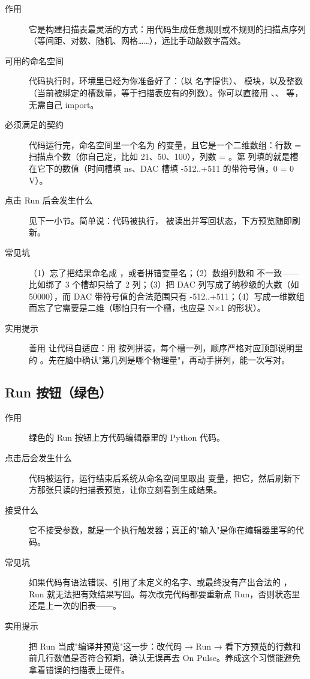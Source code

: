 \documentclass[11pt,oneside,openany]{book}
\begin{document}
\begin{description}
\item[作用] 它是构建扫描表最灵活的方式：用代码生成任意规则或不规则的扫描点序列（等间距、对数、随机、网格……），远比手动敲数字高效。
\item[可用的命名空间] 代码执行时，环境里已经为你准备好了：（以  名字提供）、 模块，以及整数 （当前被绑定的槽数量，等于扫描表应有的列数）。你可以直接用 、、 等，无需自己 import。
\item[必须满足的契约] 代码运行完，命名空间里一个名为  的变量，且它是一个二维数组：行数 = 扫描点个数（你自己定，比如 21、50、100），列数 = 。第  列填的就是槽  在它下的数值（时间槽填 ns、DAC 槽填 -512..+511 的带符号值，0 = 0 V）。
\item[点击 Run 后会发生什么] 见下一小节。简单说：代码被执行， 被读出并写回状态，下方预览随即刷新。
\item[常见坑] （1）忘了把结果命名成 ，或者拼错变量名；（2）数组列数和  不一致——比如绑了 3 个槽却只给了 2 列；（3）把 DAC 列写成了纳秒级的大数（如 50000），而 DAC 带符号值的合法范围只有 -512..+511；（4）写成一维数组而忘了它需要是二维（哪怕只有一个槽，也应是 N×1 的形状）。
\item[实用提示] 善用  让代码自适应：用  按列拼装，每个槽一列，顺序严格对应顶部说明里的 。先在脑中确认"第几列是哪个物理量"，再动手拼列，能一次写对。
\end{description}

\subsection{Run 按钮（绿色）}

\begin{description}
\item[作用] 绿色的 Run 按钮上方代码编辑器里的 Python 代码。
\item[点击后会发生什么] 代码被运行，运行结束后系统从命名空间里取出  变量，把它，然后刷新下方那张只读的扫描表预览，让你立刻看到生成结果。
\item[接受什么] 它不接受参数，就是一个执行触发器；真正的"输入"是你在编辑器里写的代码。
\item[常见坑] 如果代码有语法错误、引用了未定义的名字、或最终没有产出合法的 ，Run 就无法把有效结果写回。每次改完代码都要重新点 Run，否则状态里还是上一次的旧表——。
\item[实用提示] 把 Run 当成"编译并预览"这一步：改代码 → Run → 看下方预览的行数和前几行数值是否符合预期，确认无误再去 On Pulse。养成这个习惯能避免拿着错误的扫描表上硬件。
\end{description}
\end{document}

